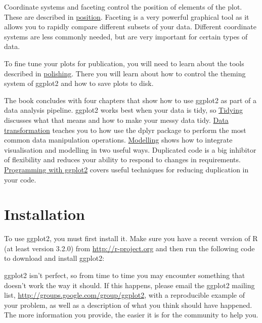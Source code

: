 Coordinate systems and faceting control the position of elements of the
plot. These are described in \hyperref[cha:position]{position}. Faceting
is a very powerful graphical tool as it allows you to rapidly compare
different subsets of your data. Different coordinate systems are less
commonly needed, but are very important for certain types of data.

To fine tune your plots for publication, you will need to learn about
the tools described in \hyperref[cha:polishing]{polishing}. There you
will learn about how to control the theming system of ggplot2 and how to
save plots to disk.

The book concludes with four chapters that show how to use ggplot2 as
part of a data analysis pipeline. ggplot2 works best when your data is
tidy, so \hyperref[cha:data]{Tidying} discusses what that means and how
to make your messy data tidy. \hyperref[cha:dplyr]{Data transformation}
teaches you to how use the dplyr package to perform the most common data
manipulation operations. \hyperref[cha:modelling]{Modelling} shows how
to integrate visualisation and modelling in two useful ways. Duplicated
code is a big inhibitor of flexibility and reduces your ability to
respond to changes in requirements.
\hyperref[cha:programming]{Programming with ggplot2} covers useful
techniques for reducing duplication in your code.

\section{Installation}\label{sec:installation}


To use ggplot2, you must first install it. Make sure you have a recent
version of R (at least version 3.2.0) from \url{http://r-project.org}
and then run the following code to download and install ggplot2:

\begin{Shaded}
\begin{Highlighting}[]
\NormalTok{(}\NormalTok{)}
\end{Highlighting}
\end{Shaded}

ggplot2 isn't perfect, so from time to time you may encounter something
that doesn't work the way it should. If this happens, please email the
ggplot2 mailing list, \url{http://groups.google.com/group/ggplot2}, with
a reproducible example of your problem, as well as a description of what
you think should have happened. The more information you provide, the
easier it is for the community to help you.

